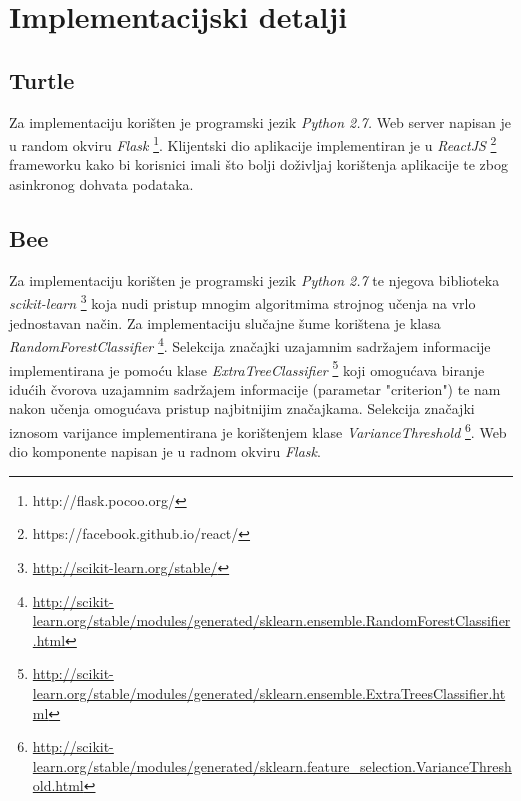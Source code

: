\section{Implementacijski detalji}

\subsection{Turtle}
Za implementaciju korišten je programski jezik \textit{Python 2.7.} Web server napisan je u random okviru \textit{Flask} \footnote{http://flask.pocoo.org/}. Klijentski dio aplikacije implementiran je u \textit{ReactJS} \footnote{https://facebook.github.io/react/} frameworku kako bi korisnici imali što bolji doživljaj korištenja aplikacije te zbog asinkronog dohvata podataka.

\subsection{Bee}

\renewcommand{\footnotesize}{\fontsize{8pt}{10pt}\selectfont}

Za implementaciju korišten je programski jezik \textit{Python 2.7} te njegova biblioteka \textit{scikit-learn} \footnote{\url{http://scikit-learn.org/stable/}} koja nudi pristup mnogim algoritmima strojnog učenja na vrlo jednostavan način. Za implementaciju slučajne šume korištena je  klasa \textit{RandomForestClassifier} \footnote{\url{http://scikit-learn.org/stable/modules/generated/sklearn.ensemble.RandomForestClassifier.html}}. Selekcija značajki uzajamnim sadržajem informacije implementirana je pomoću klase \textit{ExtraTreeClassifier} \footnote{\url{http://scikit-learn.org/stable/modules/generated/sklearn.ensemble.ExtraTreesClassifier.html}} koji omogućava biranje idućih čvorova uzajamnim sadržajem informacije (parametar "criterion") te nam nakon učenja omogućava pristup najbitnijim značajkama. Selekcija značajki iznosom varijance implementirana je korištenjem  klase \textit{VarianceThreshold} \footnote{\url{http://scikit-learn.org/stable/modules/generated/sklearn.feature_selection.VarianceThreshold.html}}.
Web dio komponente napisan je u radnom okviru \textit{Flask}.
